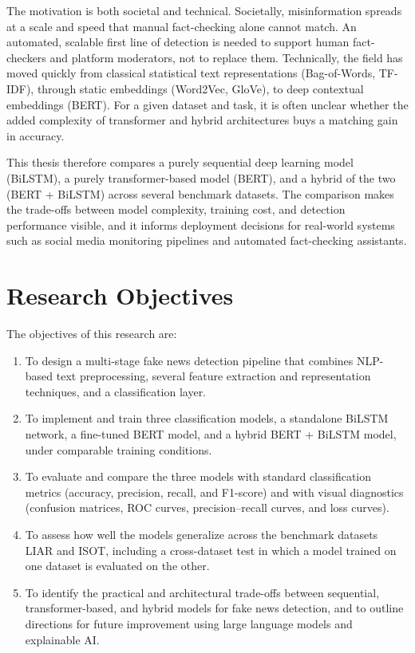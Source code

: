 The motivation is both societal and technical. Societally, misinformation spreads at a scale and speed that manual fact-checking alone cannot match. An automated, scalable first line of detection is needed to support human fact-checkers and platform moderators, not to replace them. Technically, the field has moved quickly from classical statistical text representations (Bag-of-Words, TF-IDF), through static embeddings (Word2Vec, GloVe), to deep contextual embeddings (BERT). For a given dataset and task, it is often unclear whether the added complexity of transformer and hybrid architectures buys a matching gain in accuracy.

This thesis therefore compares a purely sequential deep learning model (BiLSTM), a purely transformer-based model (BERT), and a hybrid of the two (BERT + BiLSTM) across several benchmark datasets. The comparison makes the trade-offs between model complexity, training cost, and detection performance visible, and it informs deployment decisions for real-world systems such as social media monitoring pipelines and automated fact-checking assistants.

\section{Research Objectives}

The objectives of this research are:

\begin{enumerate}
\item To design a multi-stage fake news detection pipeline that combines NLP-based text preprocessing, several feature extraction and representation techniques, and a classification layer.
\item To implement and train three classification models, a standalone BiLSTM network, a fine-tuned BERT model, and a hybrid BERT + BiLSTM model, under comparable training conditions.
\item To evaluate and compare the three models with standard classification metrics (accuracy, precision, recall, and F1-score) and with visual diagnostics (confusion matrices, ROC curves, precision--recall curves, and loss curves).
\item To assess how well the models generalize across the benchmark datasets LIAR and ISOT, including a cross-dataset test in which a model trained on one dataset is evaluated on the other.
\item To identify the practical and architectural trade-offs between sequential, transformer-based, and hybrid models for fake news detection, and to outline directions for future improvement using large language models and explainable AI.
\end{enumerate}

